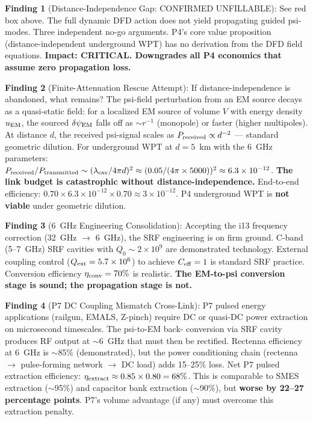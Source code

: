 \documentclass[11pt]{article}
\newcommand{\ee}[1]{\times 10^{#1}}
\begin{document}
\begin{tcolorbox}[colback=blue!5!white, colframe=blue!60!black,
  title=\textbf{W4i14 P4: Five Key Findings}]

\textbf{Finding 1} (Distance-Independence Gap: CONFIRMED UNFILLABLE):
See red box above. The full dynamic DFD action does not yield propagating
guided psi-modes. Three independent no-go arguments. P4's core value
proposition (distance-independent underground WPT) has no derivation from
the DFD field equations. \textbf{Impact: CRITICAL. Downgrades all P4
economics that assume zero propagation loss.}

\textbf{Finding 2} (Finite-Attenuation Rescue Attempt):
If distance-independence is abandoned, what remains? The psi-field
perturbation from an EM source decays as a quasi-static field: for a
localized EM source of volume $V$ with energy density $u_{\rm EM}$, the
sourced $\delta\psi_{\rm EM}$ falls off as $\sim r^{-1}$ (monopole) or
faster (higher multipoles). At distance $d$, the received psi-signal scales
as $P_{\rm received} \propto d^{-2}$ --- standard geometric dilution.
For underground WPT at $d = 5$~km with the 6~GHz parameters:
$P_{\rm received}/P_{\rm transmitted} \sim (\lambda_{\rm cav}/4\pi d)^2
\approx (0.05/(4\pi \times 5000))^2 \approx 6.3\ee{-12}$.
\textbf{The link budget is catastrophic without distance-independence.}
End-to-end efficiency: $0.70 \times 6.3\ee{-12} \times 0.70 \approx
3\ee{-12}$. P4 underground WPT is \textbf{not viable} under geometric
dilution.

\textbf{Finding 3} (6~GHz Engineering Consolidation):
Accepting the i13 frequency correction (32~GHz $\to$ 6~GHz), the SRF
engineering is on firm ground. C-band (5--7~GHz) SRF cavities with
$Q_0 \sim 2\ee{9}$ are demonstrated technology. External coupling control
($Q_{\rm ext} = 5.7\ee{6}$) to achieve $C_{\rm eff} = 1$ is standard
SRF practice. Conversion efficiency $\eta_{\rm conv} = 70\%$ is realistic.
\textbf{The EM-to-psi conversion stage is sound; the propagation stage
is not.}

\textbf{Finding 4} (P7 DC Coupling Mismatch Cross-Link):
P7 pulsed energy applications (railgun, EMALS, Z-pinch) require DC or
quasi-DC power extraction on microsecond timescales. The psi-to-EM back-
conversion via SRF cavity produces RF output at $\sim$6~GHz that must
then be rectified. Rectenna efficiency at 6~GHz is $\sim$85\% (demonstrated),
but the power conditioning chain (rectenna $\to$ pulse-forming network
$\to$ DC load) adds 15--25\% loss. Net P7 pulsed extraction efficiency:
$\eta_{\rm extract} \approx 0.85 \times 0.80 = 68\%$. This is comparable
to SMES extraction ($\sim$95\%) and capacitor bank extraction ($\sim$90\%),
but \textbf{worse by 22--27 percentage points}. P7's volume advantage
(if any) must overcome this extraction penalty.


\end{tcolorbox}
\end{document}
